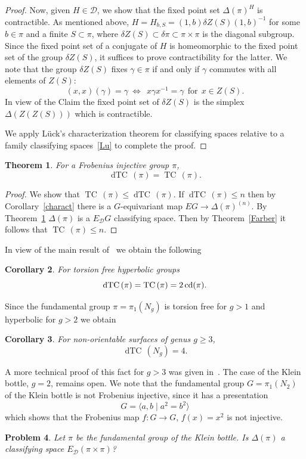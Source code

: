 \documentclass{amsart}
\numberwithin{equation}{section}
\theoremstyle{plain}
\newtheorem{thm}{Theorem}[subsection]
\newtheorem{cor}[thm]{Corollary}
\newtheorem{question}[thm]{Problem}
\theoremstyle{definition}
\def\TC{{\mathop\mathrm{TC}\,}}
\def\dTC{{\mathop\mathrm{dTC}\,}}
\def\cd{\protect\operatorname{cd}}
\begin{document}
\begin{proof}
Now, given $H\in\mathcal D$, we show that the fixed point set $\Delta(\pi)^H$ is contractible.  As mentioned above, $H=H_{b,S}=(1,b)\delta Z(S)(1,b)^{-1}$ for some $b\in\pi$ and  a finite $S\subset \pi$, where $\delta Z(S)\subset\delta\pi\subset \pi\times\pi$ is the diagonal subgroup.
Since the fixed point set of a conjugate of $H$ is homeomorphic to the fixed point set of the group $ \delta Z(S)$, it suffices to prove contractibility for the latter.
We note that the group  $ \delta Z(S)$ fixes $\gamma\in\pi$ if and only if $\gamma$ commutes with all elements of $Z(S)$: $$(x,x)(\gamma)=\gamma\ \Leftrightarrow\ \ x\gamma x^{-1}=\gamma\ \ \text{for}\ \ x\in Z(S).$$ In view of the Claim the fixed point set of $\delta Z(S)$ is the simplex $\Delta(Z(Z(S)))$ which is contractible.


We apply L\"{u}ck's characterization theorem for classifying spaces relative to a family classifying spaces~\ref{Lu} to complete the proof.
\end{proof}



\begin{thm}\label{Frob}
For a Frobenius injective group $\pi$,  $$\dTC(\pi)=\TC(\pi).$$
\end{thm}
\begin{proof}
We show that $\TC(\pi)\le\dTC(\pi)$.
If $\dTC(\pi)\le n$ then by Corollary~\ref{charact} there is  a $G$-equivariant map $EG\to\Delta(\pi)^{(n)}$.
By Theorem~\ref{Frob} $\Delta(\pi)$ is a $E_{\mathcal D}G$ classifying space. Then by Theorem~\ref{Farber}  it follows that $\TC(\pi)\le n$.
\end{proof}
In view of the main result of~\cite{Dr1} we obtain the following
\begin{cor}
For torsion free hyperbolic groups $$\dTC(\pi)=\TC(\pi)=2\cd(\pi).$$
\end{cor}
Since the fundamental group $\pi=\pi_1(N_g)$ is torsion free for $g>1$ and hyperbolic for $g>2$  we obtain
\begin{cor}
For non-orientable surfaces of genus $g\ge 3$,$$\dTC(N_g)=4.$$
\end{cor}
A more technical proof of this fact for $g>3$ was given in~\cite{Dr2}. 
The case of the Klein bottle, $g=2$, remains open.
We note that the fundamental group $G=\pi_1(N_2)$ of the Klein bottle is not Frobenius injective,
since it has a presentation $$G=\langle a,b\mid a^2=b^2\rangle$$ which shows that
the Frobenius map  $f:G\to G$, $f(x)=x^2$ is not injective.

\begin{question}
Let $\pi$ be the fundamental group of the Klein bottle. Is $\Delta(\pi)$ a classifying space $E_{\mathcal D}(\pi\times\pi)$?
\end{question}
\end{document}
